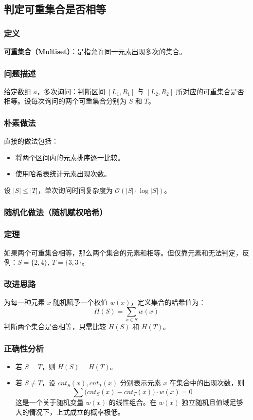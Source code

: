 \documentclass[11pt,a4paper,twocolumn]{ctexart}  %
\begin{document}
\subsection{判定可重集合是否相等}
\subsubsection*{定义}
\textbf{可重集合（Multiset）}：是指允许同一元素出现多次的集合。

\subsubsection*{问题描述}
给定数组 $a$，多次询问：判断区间 $[L_1,R_1]$ 与 $[L_2,R_2]$ 所对应的可重集合是否相等。设每次询问的两个可重集合分别为 $S$ 和 $T$。

\subsubsection*{朴素做法}
直接的做法包括：
\begin{itemize}
    \item 将两个区间内的元素排序逐一比较。
    \item 使用哈希表统计元素出现次数。
\end{itemize}
设 $|S|\le|T|$，单次询问时间复杂度为 $\mathcal{O}(|S|\cdot\log|S|)$。

\subsubsection*{随机化做法（随机赋权哈希）}
\subsubsection*{定理}
如果两个可重集合相等，那么两个集合的元素和相等。但仅靠元素和无法判定，反例：$S=\{2,4\},\ T=\{3,3\}$。

\subsubsection*{改进思路}
为每一种元素 $x$ 随机赋予一个权值 $w(x)$，定义集合的哈希值为：
\[
H(S)=\sum_{x\in S} w(x)
\]
判断两个集合是否相等，只需比较 $H(S)$ 和 $H(T)$。

\subsubsection*{正确性分析}
\begin{itemize}
    \item 若 $S=T$，则 $H(S)=H(T)$。
    \item 若 $S\neq T$，设 $cnt_S(x),cnt_T(x)$ 分别表示元素 $x$ 在集合中的出现次数，则
    \[
    \sum\bigl(cnt_S(x)-cnt_T(x)\bigr)\cdot w(x)=0
    \]
    这是一个关于随机变量 $w(x)$ 的线性组合。在 $w(x)$ 独立随机且值域足够大的情况下，上式成立的概率极低。
\end{itemize}
\end{document}
